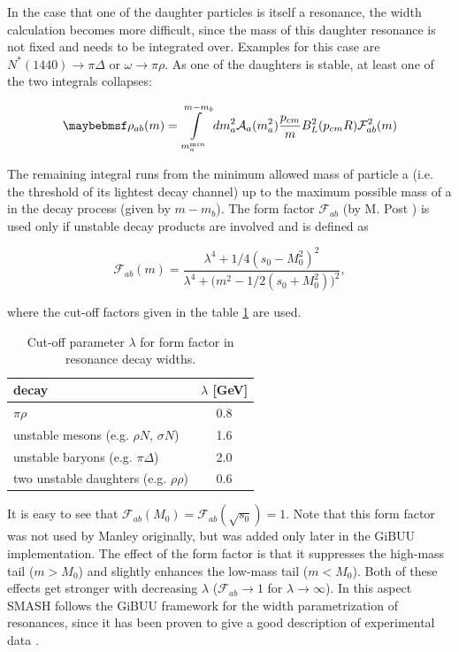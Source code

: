 In the case that one of the daughter particles is itself a resonance, the width
calculation becomes more difficult, since the mass of this daughter resonance
is not fixed and needs to be integrated over. Examples for this case are
$N^*(1440)\rightarrow\pi\Delta$ or $\omega\rightarrow\pi\rho$. As one of the
daughters is stable, at least one of the two integrals collapses:

\begin{equation} \label{eq:decay_semistable}
  \rho_{ab}(m) = \int \displaylimits_{m_a^{\textrm min}}^{m-m_b} dm^2_a
         \mathcal{A}_a(m^2_a) \frac{p_{cm}}{m} B_L^2(p_{cm} R)
         \mathcal{F}_{ab}^2(m)
\end{equation}

The remaining integral runs from the minimum allowed mass of particle a (i.e.
the threshold of its lightest decay channel) up to the maximum possible mass of
a in the decay process (given by $m-m_b$). The form factor $\mathcal{F}_{ab}$
(by M. Post \cite{Post:2003hu}) is used only if unstable decay products are
involved and is defined as

\begin{equation} \label{eq:post_ff}
  \mathcal{F}_{ab}(m) =
   \frac{\lambda^4+1/4(s_0-M_0^2)^2}{\lambda^4+\big(m^2-1/2(s_0+M_0^2)\big)^2},
\end{equation}

where the cut-off factors given in the table \ref{tab:cut-off} are used.

\begin{table}
\caption{Cut-off parameter $\lambda$ for form factor in resonance decay widths.}
\label{tab:cut-off}
\begin{tabular}{lc}
\toprule
 decay & $\lambda$ [GeV] \\
\midrule
 $\pi\rho$                                   & 0.8 \\
 unstable mesons (e.g. $\rho N$, $\sigma N$) & 1.6 \\
 unstable baryons (e.g. $\pi\Delta$)         & 2.0 \\
 two unstable daughters (e.g. $\rho\rho$)    & 0.6 \\
\bottomrule
\end{tabular}
\end{table}


It is easy to see that $\mathcal{F}_{ab}(M_0)=\mathcal{F}_{ab}(\sqrt{s_0})=1$.
Note that this form factor was not used by Manley originally, but was added
only later in the GiBUU implementation. The effect of the form factor is that
it suppresses the high-mass tail ($m>M_0$) and slightly enhances the low-mass
tail ($m<M_0$). Both of these effects get stronger with decreasing $\lambda$
($\mathcal{F}_{ab}\rightarrow 1$ for $\lambda\rightarrow\infty$). In this aspect
SMASH follows the GiBUU framework for the width parametrization of
resonances, since it has been proven to give a good description of experimental
data \cite{Buss:2011mx}.

